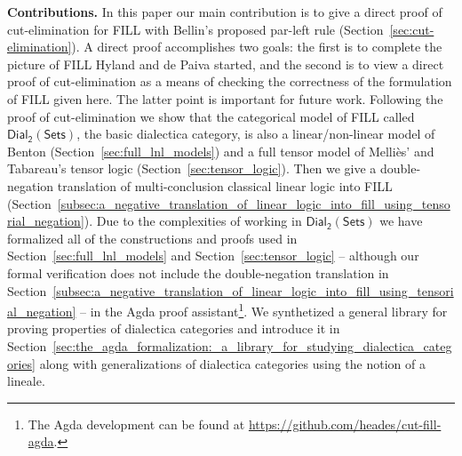 \documentclass[preprint,6pt]{elsarticle}
\newcommand{\dial}[0]{\mathsf{Dial_2}(\mathsf{Sets})}
\begin{document}
\textbf{Contributions.} In this paper our main contribution is to give
a direct proof of cut-elimination for FILL with Bellin's proposed
par-left rule (Section~\ref{sec:cut-elimination}).  A direct proof
accomplishes two goals: the first is to complete the picture of FILL
Hyland and de Paiva started, and the second is to view a direct proof
of cut-elimination as a means of checking the correctness of the
formulation of FILL given here.  The latter point is important for
future work.  Following the proof of cut-elimination we show that the
categorical model of FILL called $\dial$, the basic dialectica
category, is also a linear/non-linear model of Benton
(Section~\ref{sec:full_lnl_models}) and a full tensor model of
Melli\`es' and Tabareau's tensor logic
(Section~\ref{sec:tensor_logic}). Then we give a double-negation
translation of multi-conclusion classical linear logic into FILL
(Section~\ref{subsec:a_negative_translation_of_linear_logic_into_fill_using_tensorial_negation}).
Due to the complexities of working in $\dial$ we have formalized all
of the constructions and proofs used in
Section~\ref{sec:full_lnl_models} and Section~\ref{sec:tensor_logic}
-- although our formal verification does not include the
double-negation translation in
Section~\ref{subsec:a_negative_translation_of_linear_logic_into_fill_using_tensorial_negation}
-- in the Agda proof assistant\footnote{The Agda development can be
  found at \url{https://github.com/heades/cut-fill-agda}.}.  We
synthetized
a general library for proving properties of dialectica
categories and introduce it in
Section~\ref{sec:the_agda_formalization:_a_library_for_studying_dialectica_categories}
along with generalizations of dialectica categories using the notion
of a lineale.
\end{document}
